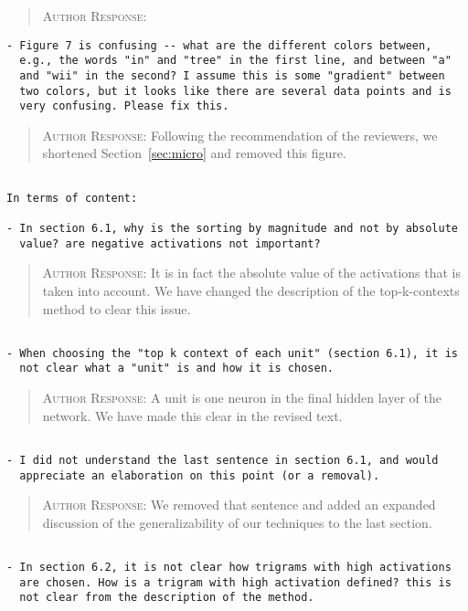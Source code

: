 \begin{quote}
\textsc{Author Response:}  
\end{quote}
\begin{verbatim}
- Figure 7 is confusing -- what are the different colors between,
  e.g., the words "in" and "tree" in the first line, and between "a"
  and "wii" in the second? I assume this is some "gradient" between
  two colors, but it looks like there are several data points and is
  very confusing. Please fix this.
\end{verbatim}  
\begin{quote}
\textsc{Author Response:}  Following the recommendation of the reviewers,
we shortened Section~\ref{sec:micro} and removed this figure.
\end{quote}
\begin{verbatim}

In terms of content:

- In section 6.1, why is the sorting by magnitude and not by absolute
  value? are negative activations not important?
\end{verbatim}  
\begin{quote}
\textsc{Author Response:}  It is in fact the absolute value of the activations 
that is taken into account. We have changed the description of the top-k-contexts 
method to clear this issue.
\end{quote}
\begin{verbatim}

- When choosing the "top k context of each unit" (section 6.1), it is
  not clear what a "unit" is and how it is chosen.
\end{verbatim}  
\begin{quote}
\textsc{Author Response:}  A unit is one neuron in the final hidden layer 
of the network. We have made this clear in the revised text.
\end{quote}
\begin{verbatim}

- I did not understand the last sentence in section 6.1, and would
  appreciate an elaboration on this point (or a removal).
\end{verbatim}  
\begin{quote}
\textsc{Author Response:}  We removed that sentence and added an expanded discussion of the generalizability of our techniques to the last section.
\end{quote}
\begin{verbatim}

- In section 6.2, it is not clear how trigrams with high activations
  are chosen. How is a trigram with high activation defined? this is
  not clear from the description of the method.
\end{verbatim}  
